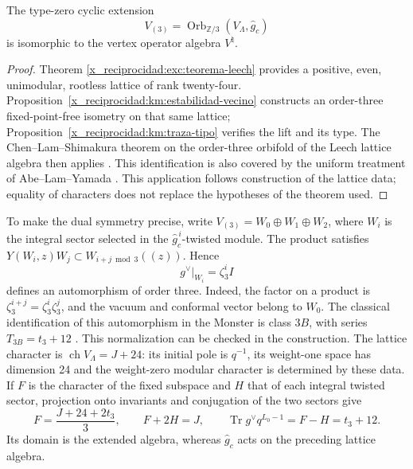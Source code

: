 \begin{theorem}
\label{x_reciprocidad:km:moonshine-tres}
The type-zero cyclic extension
\begin{equation}
 V_{(3)}=\operatorname{Orb}_{\mathbb Z/3}
                 (V_\Lambda,\widehat g_c)
 \label{x_reciprocidad:km:extension-orden3}
\end{equation}
is isomorphic to the vertex operator algebra \(V^\natural\).
\end{theorem}
\begin{proof}
Theorem \ref{x_reciprocidad:exc:teorema-leech} provides a positive,
even, unimodular, rootless lattice of rank twenty-four.
Proposition~\ref{x_reciprocidad:km:estabilidad-vecino} constructs an order-three
fixed-point-free isometry on that same lattice;
Proposition~\ref{x_reciprocidad:km:traza-tipo} verifies the lift and its type.
The Chen--Lam--Shimakura theorem on the order-three orbifold
of the Leech lattice algebra then applies
\cite[Teorema~1.1]{x_reciprocidad:chenlamshimakura2016}. This identification is also covered
by the uniform treatment of Abe--Lam--Yamada
\cite[Teorema~4.4 y secciones~2--4]{x_reciprocidad:abelamyamada2017}. This application follows construction
of the lattice data; equality of characters does not replace the
hypotheses of the theorem used.
\end{proof}

To make the dual symmetry precise, write
\(V_{(3)}=W_0\oplus W_1\oplus W_2\), where \(W_i\) is the integral
sector selected in the \(\widehat g_c^{\,i}\)-twisted module.
The product satisfies
\(Y(W_i,z)W_j\subset W_{i+j\bmod3}((z))\). Hence
\begin{equation}
 g^\vee|_{W_i}=\zeta_3^i I
 \label{x_reciprocidad:km:dual-ciclico}
\end{equation}
defines an automorphism of order three. Indeed, the factor on a
product is \(\zeta_3^{i+j}=\zeta_3^i\zeta_3^j\), and the vacuum and
conformal vector belong to \(W_0\). The classical identification of
this automorphism in the Monster is class \(3B\), with series
\(T_{3B}=t_3+12\) \cite{x_reciprocidad:kmconwaynorton1979,x_reciprocidad:borcherds}.
This normalization can be checked in the construction. The lattice
character is \(\operatorname{ch}V_\Lambda=J+24\): its initial pole
is \(q^{-1}\), its weight-one space has dimension 24 and the
weight-zero modular character is determined by these data.
If \(F\) is the character of the fixed subspace and \(H\) that of each
integral twisted sector, projection onto invariants and conjugation
of the two sectors give
\[
 F=\frac{J+24+2t_3}{3},\qquad F+2H=J,
 \qquad \operatorname{Tr}g^\vee q^{L_0-1}=F-H=t_3+12.
\]
Its domain is the extended algebra, whereas
\(\widehat g_c\) acts on the preceding lattice algebra.

